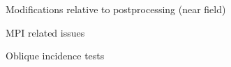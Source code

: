 \documentclass[smaller,xcolor=table,dvipsnames]{beamer}
\newcommand{\dirinputtex}{./inputtex}
\begin{document}

  \begin{frame}[plain]
    \centering \Large{Modifications relative to postprocessing (near
      field)}
    
  \end{frame}
  
  
  

  \begin{frame}[plain,label=MPI]
    \centering    \Large{MPI related issues}
  \end{frame}


  

  \begin{frame}[plain,label=TestOblicuo]
    \centering    \Large{Oblique incidence tests}
  \end{frame}







  
\end{document}
